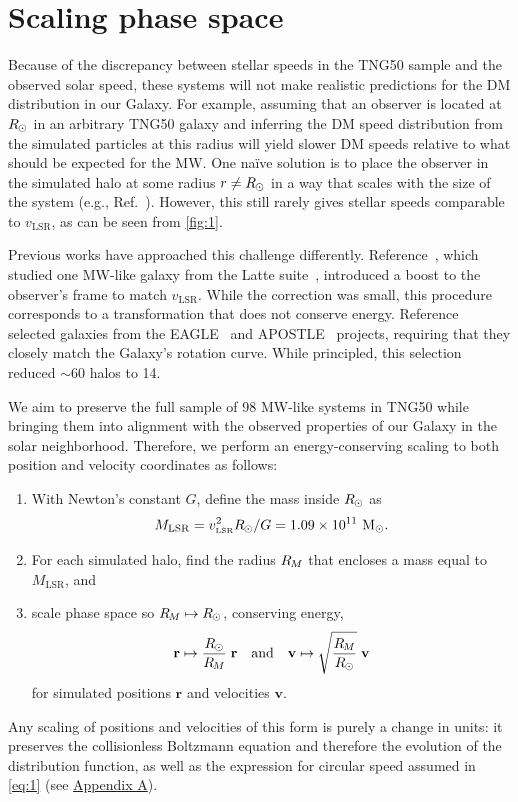 \documentclass[aps,prl,reprint,superscriptaddress,nopreprintnumbers,nobibnotes,floatfix,longbibliography,footinbib]{revtex4-2}
\newcommand{\TNGfifty}{TNG50}
\newcommand{\vLSR}{\ensuremath{v_\mathrm{\scriptscriptstyle LSR}}}
\newcommand{\MLSR}{\ensuremath{M_\mathrm{LSR}}}
\newcommand{\osim}{\mathord{\sim}}
\newcommand{\Msun}{\ensuremath{\mathrm{M}_\odot}}
\newcommand{\Rsun}{\ensuremath{R_{\kern-0.1ex\odot}}}
\newcommand{\Rm}{\ensuremath{R_{\kern-0.2ex M}}}
\newcommand{\vb}[1]{\ensuremath{\mathbf{#1}}}
\begin{document}
\section{Scaling phase space}
\label{sec:3}
Because of the discrepancy between stellar speeds in the \TNGfifty{} sample and the observed solar speed, these systems will not make realistic predictions for the DM distribution in our Galaxy. For example, assuming that an observer is located at $\Rsun$ in an arbitrary \TNGfifty{} galaxy and inferring the DM speed distribution from the simulated particles at this radius will yield slower DM speeds relative to what should be expected for the MW. One na\"ive solution is to place the observer in the simulated halo at some radius $r \neq \Rsun$ in a way that scales with the size of the system (e.g., Ref.~\citep{Poole-McKenzie20}). However, this still rarely gives stellar speeds comparable to $\vLSR$, as can be seen from \autoref{fig:1}.

Previous works have approached this challenge differently. Reference~\citep{Lawrence23}, which studied one MW-like galaxy from the Latte suite~\citep{Wetzel16,Wetzel23}, introduced a boost to the observer's frame to match $\vLSR$. While the correction was small, this procedure corresponds to a transformation that does not conserve energy. Reference~\citep{Bozorgnia16} selected galaxies from the EAGLE~\citep{Schaye15,Crain15} and APOSTLE~\cite{Sawala16,Fattahi16} projects, requiring that they closely match the Galaxy's rotation curve. While principled, this selection reduced $\osim 60$ halos to 14. 

We aim to preserve the full sample of 98 MW-like systems in \TNGfifty{} while bringing them into alignment with the observed properties of our Galaxy in the solar neighborhood. Therefore, we perform an energy-conserving scaling to both position and velocity coordinates as follows:
\begin{enumerate}
\item With Newton's constant $G$, define the mass inside \Rsun{} as
 \begin{equation}
 \MLSR = \vLSR^2 \Rsun/G = 1.09\times 10^{11}~\Msun{}.
 \label{eq:1}
 \end{equation}
\item For each simulated halo, find the radius $\Rm$ that encloses a mass equal to \MLSR{}, and
\item scale phase space so $\Rm \mapsto \Rsun$, conserving energy,
\begin{equation}
 \vb{r} \mapsto  \frac{\Rsun}{\Rm}\;\vb{r}\quad\text{and}\quad \vb{v} \mapsto  \sqrt{\frac{\Rm}{\Rsun}}\;\vb{v}
\end{equation}
for simulated positions $\vb{r}$ and velocities $\vb{v}$.
\end{enumerate}
Any scaling of positions and velocities of this form is purely a change in units: it preserves the collisionless Boltzmann equation and therefore the evolution of the distribution function, as well as the expression for circular speed assumed in \autoref{eq:1} (see \hyperref[app:A]{Appendix A}). 
\end{document}
